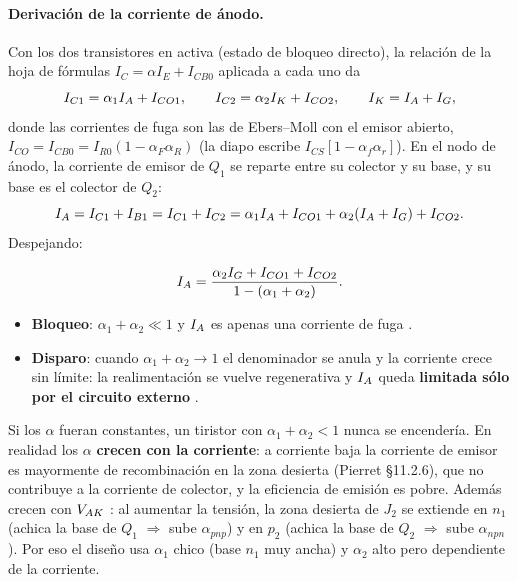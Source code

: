 \paragraph{Derivación de la corriente de ánodo.}
Con los dos transistores en activa (estado de bloqueo directo), la relación de la hoja de fórmulas
$I_C=\alpha I_E+I_{CB0}$ \enhojatexto{} aplicada a cada uno da 
\[
  I_{C1}=\alpha_1I_{A}+I_{CO1},\qquad I_{C2}=\alpha_2I_K+I_{CO2},\qquad I_K=I_{A}+I_{G} ,
\]
donde las corrientes de fuga son las de Ebers--Moll con el emisor abierto,
$I_{CO}=I_{CB0}=I_{R0}(1-\alpha_F\alpha_R)$ (la diapo escribe $I_{CS}[1-\alpha_f\alpha_r]$). En el nodo de
ánodo, la corriente de emisor de $Q_1$ se reparte entre su colector y su base, y su base es el
colector de $Q_2$:
\[
  I_{A}=I_{C1}+I_{B1}=I_{C1}+I_{C2}=\alpha_1I_{A}+I_{CO1}+\alpha_2(I_{A}+I_{G})+I_{CO2}.
\]
Despejando:

\begin{clave}
\[
  I_{A}=\frac{\alpha_2I_{G}+I_{CO1}+I_{CO2}}{1-(\alpha_1+\alpha_2)} .
\]
\begin{itemize}
  \item \textbf{Bloqueo}: $\alpha_1+\alpha_2\ll1$ y $I_{A}$ es apenas una corriente de fuga .
  \item \textbf{Disparo}: cuando $\alpha_1+\alpha_2\to1$ el denominador se anula y la corriente crece
  sin límite: la realimentación se vuelve regenerativa y $I_{A}$ queda \textbf{limitada sólo por el
  circuito externo} .
\end{itemize}
\end{clave}

\begin{intuicion}
Si los $\alpha$ fueran constantes, un tiristor con $\alpha_1+\alpha_2<1$ nunca se encendería. En
realidad los $\alpha$ \textbf{crecen con la corriente}: a corriente baja la corriente de emisor es
mayormente de recombinación en la zona desierta (Pierret §11.2.6), que no contribuye a la corriente
de colector, y la eficiencia de emisión es pobre. Además crecen con $V_{AK}$ : al aumentar la
tensión, la zona desierta de $J_2$ se extiende en $n_1$ (achica la base de $Q_1$ $\Rightarrow$ sube
$\alpha_{pnp}$) y en $p_2$ (achica la base de $Q_2$ $\Rightarrow$ sube $\alpha_{npn}$). Por eso el
diseño usa $\alpha_1$ chico (base $n_1$ muy ancha) y $\alpha_2$ alto pero dependiente de la corriente.
\end{intuicion}

